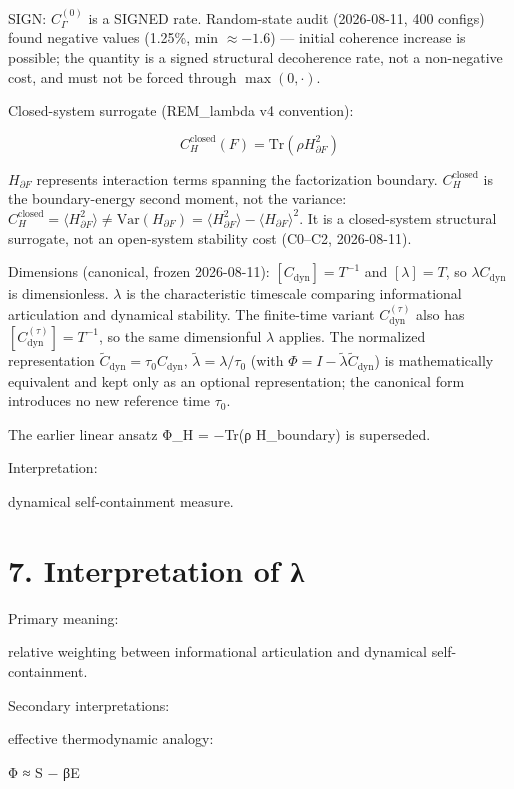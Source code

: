 \documentclass[
]{article}
\begin{document}
SIGN: $C_\Gamma^{(0)}$ is a SIGNED rate. Random-state audit (2026-08-11, 400
configs) found negative values (1.25\%, min $\approx -1.6$) — initial coherence
increase is possible; the quantity is a signed structural decoherence
rate, not a non-negative cost, and must not be forced through $\max(0,\cdot)$.

Closed-system surrogate (REM\_lambda v4 convention):

\[
C_H^{\mathrm{closed}}(F) = \mathrm{Tr}(\rho H_{\partial F}^2)
\]

$H_{\partial F}$ represents interaction terms spanning the factorization
boundary. $C_H^{\mathrm{closed}}$ is the boundary-energy second moment, not the
variance: $C_H^{\mathrm{closed}} = \langle H_{\partial F}^2\rangle \neq
\mathrm{Var}(H_{\partial F}) = \langle H_{\partial F}^2\rangle -
\langle H_{\partial F}\rangle^2$.
It is a closed-system structural surrogate, not an open-system stability
cost (C0--C2, 2026-08-11).

Dimensions (canonical, frozen 2026-08-11): $[C_{\mathrm{dyn}}] = T^{-1}$
and $[\lambda] = T$, so $\lambda C_{\mathrm{dyn}}$ is dimensionless.
$\lambda$ is the characteristic timescale comparing informational
articulation and dynamical stability. The finite-time variant
$C_{\mathrm{dyn}}^{(\tau)}$ also has $[C_{\mathrm{dyn}}^{(\tau)}] = T^{-1}$,
so the same dimensionful $\lambda$ applies. The normalized representation
$\tilde C_{\mathrm{dyn}} = \tau_0 C_{\mathrm{dyn}}$,
$\tilde\lambda = \lambda/\tau_0$ (with
$\Phi = I - \tilde\lambda \tilde C_{\mathrm{dyn}}$) is mathematically
equivalent and kept only as an optional representation; the canonical
form introduces no new reference time $\tau_0$.

The earlier linear ansatz Φ\_H = −Tr(ρ H\_boundary) is superseded.

Interpretation:

dynamical self-containment measure.

\section{7. Interpretation of λ}\label{interpretation-of-ux3bb}

Primary meaning:

relative weighting between informational articulation and dynamical
self-containment.

Secondary interpretations:

effective thermodynamic analogy:

Φ ≈ S − βE
\end{document}
